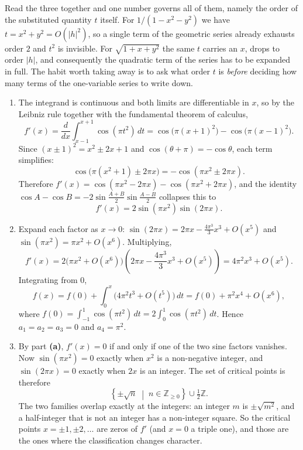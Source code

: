 \begin{remark}
Read the three together and one number governs all of them, namely the order of the substituted
quantity $t$ itself. For $1/(1-x^2-y^2)$ we have $t = x^2+y^2 = O(|h|^2)$, so a single term of the
geometric series already exhausts order $2$ and $t^2$ is invisible. For $\sqrt{1+x+y^2}$ the same
$t$ carries an $x$, drops to order $|h|$, and consequently the quadratic term of the series has to
be expanded in full. The habit worth taking away is to ask what order $t$ is \emph{before}
deciding how many terms of the one-variable series to write down.
\end{remark}

\begin{exercisesolution}
\label{sol:taylor_parametric_integral}
\begin{enumerate}[label=\textbf{(\alph*)}]
  \item The integrand is continuous and both limits are differentiable in $x$, so by the Leibniz
    rule together with the fundamental theorem of calculus,
\[f'(x) = \frac{d}{dx} \int_{x-1}^{x+1} \cos(\pi t^2) \, dt = \cos\big(\pi (x+1)^2\big) - \cos\big(\pi (x-1)^2\big).\]
Since $(x\pm1)^2 = x^2 \pm 2x + 1$ and $\cos(\theta+\pi) = -\cos\theta$, each term simplifies:
\[\cos\big(\pi(x^2+1) \pm 2\pi x\big) = -\cos(\pi x^2 \pm 2\pi x).\]
Therefore $f'(x) = \cos(\pi x^2 - 2\pi x) - \cos(\pi x^2 + 2\pi x)$, and the identity
$\cos A - \cos B = -2\sin\frac{A+B}{2}\sin\frac{A-B}{2}$ collapses this to
\[f'(x) = 2 \sin(\pi x^2) \sin(2\pi x).\]

  \item Expand each factor as $x \to 0$: $\sin(2\pi x) = 2\pi x - \frac{4\pi^3}{3} x^3 + O(x^5)$ and
    $\sin(\pi x^2) = \pi x^2 + O(x^6)$. Multiplying,
\[f'(x) = 2 \big(\pi x^2 + O(x^6)\big)\left(2\pi x - \frac{4\pi^3}{3}x^3 + O(x^5)\right) = 4\pi^2 x^3 + O(x^5).\]
Integrating from $0$,
\[f(x) = f(0) + \int_0^x \big(4\pi^2 t^3 + O(t^5)\big)\,dt = f(0) + \pi^2 x^4 + O(x^6),\]
where $f(0) = \int_{-1}^1 \cos(\pi t^2)\,dt = 2\int_0^1 \cos(\pi t^2)\,dt$. Hence
$a_1 = a_2 = a_3 = 0$ and $a_4 = \pi^2$.

  \item By part \textbf{(a)}, $f'(x) = 0$ if and only if one of the two sine factors vanishes.
    Now $\sin(\pi x^2) = 0$ exactly when $x^2$ is a non-negative integer, and $\sin(2\pi x) = 0$
    exactly when $2x$ is an integer. The set of critical points is therefore
\[\left\{\pm\sqrt{n} \;\middle|\; n \in \mathbb{Z}_{\geq 0}\right\} \cup \tfrac{1}{2}\mathbb{Z}.\]
    The two families overlap exactly at the integers: an integer $m$ is $\pm\sqrt{m^2}$, and a
    half-integer that is not an integer has a non-integer square. So the critical points
    $x = \pm 1, \pm 2, \dots$ are  zeros of $f'$ (and $x = 0$ a triple one), and
    those are the ones where the classification changes character.


\end{enumerate}
\end{exercisesolution}
